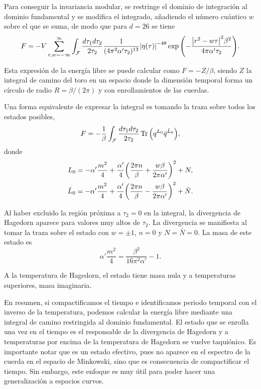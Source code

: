 Para conseguir la invariancia modular, se restringe el dominio de integración al dominio
fundamental y se modifica el integrado, añadiendo el número cuántico $w$ sobre el que 
se suma, de modo que para $d=26$ se tiene
\begin{equation}
  F=-V \sum_{r,w=-\infty}^{\infty} \int_\mathcal{F}  \frac{d\tau_1d\tau_2}{2\tau_2}   \frac{1}{(4\pi^2\alpha'\tau_2)^{13}}
  \abs{\eta(\tau)}^{-48}\exp\qty(-\frac{\abs{r^2-w\tau}^2\beta^2}{4\pi\alpha'\tau_2}).
  \label{eq:fund}
\end{equation}

Esta expresión de la energía libre se puede calcular como $F=-Z/\beta$, siendo $Z$ la integral de camino del toro en
un espacio donde la dimensión temporal forma un círculo de radio $R=\beta/(2\pi)$ y con enrollamientos
de las cuerdas.

Una forma equivalente de expresar la integral es tomando la traza sobre todos los estados posibles,
\begin{equation}
  F =-\frac{1}{\beta} \int_{\mathcal F} \frac{d\tau_1 d\tau_2}{2\tau_2} \Tr\qty(q^{L_0} \bar q^{\bar L_0}),
\end{equation}
donde 
\begin{equation}
  \begin{gathered}
         L_0 =  -\alpha'\frac{m^2}{4} + \frac{\alpha'}{4}\qty(\frac{2\pi n}{\beta} + \frac{w\beta}{2\pi\alpha'})^2 + N,\\
    \bar L_0 =  -\alpha'\frac{m^2}{4} + \frac{\alpha'}{4}\qty(\frac{2\pi n}{\beta} - \frac{w\beta}{2\pi\alpha'})^2 +\bar N.
  \end{gathered}
\end{equation}

Al haber excluido la región próxima a $\tau_2=0$ en la integral, la divergencia de Hagedorn aparece para
valores muy altos de $\tau_2$.
La divergencia se manifiesta al tomar la traza sobre el estado con $w=\pm 1$, $n=0$ y $N=\bar N=0$.
La masa de este estado es
\begin{equation}
  \alpha' \frac{m^2}{4} = \frac{\beta^2}{16\pi^2\alpha'} -1.
\end{equation}

A la temperatura de Hagedorn, el estado tiene masa nula y a temperaturas superiores, masa
imaginaria.

En resumen, si compactificamos el tiempo e identificamos periodo temporal con el inverso de la
temperatura, podemos calcular la energía libre mediante una integral de camino restringida
al dominio fundamental.
El estado que se enrolla una vez en el tiempo es el responsable de la divergencia de Hagedorn y
a temperaturas por encima de la temperatura de Hagedorn se vuelve taquiónico.
Es importante notar que es un estado efectivo, pues no aparece en el espectro de la cuerda en 
el espacio de Minkowski, sino que es consecuencia de compactificar el tiempo.
Sin embargo, este enfoque es muy útil para poder hacer una generalización a espacios curvos.


